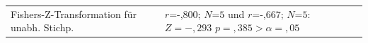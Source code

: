 \documentclass[a4paper,11pt]{article}%
\renewcommand{\\}{\vspace*{0.5\baselineskip} \newline}
\begin{document}
{\begin{table}[H]
\begin{tabularx}{\textwidth}{| p{3.7cm} | p{5cm} | p{5cm} |}
		\hline 		

		Fishers-Z-Transformation für unabh. Stichp.
		&
		& $\textit{r=-,800; N=5}$ und $\textit{r=-,667; N=5} :$\newline \newline
		$Z=-,293$\newline
		$p=,385>\alpha=,05$ \\
		
		\hline 	
	\end{tabularx}
\end{table}		


%



%
%
%
%
%
%	





}
\end{document}
